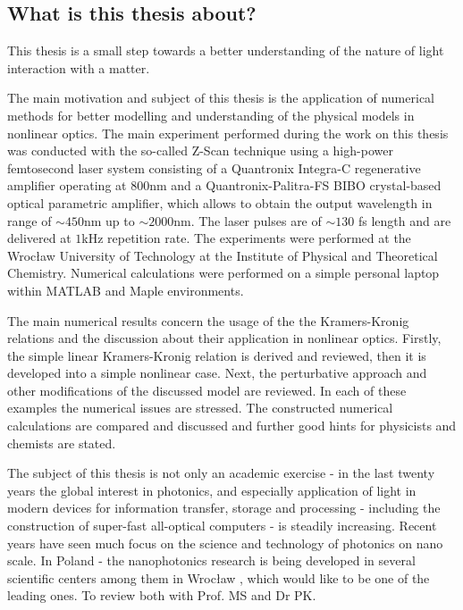 \documentclass[12pt,twoside,a4paper]{article}
\numberwithin{equation}{subsection}
\numberwithin{figure}{subsection}
\begin{document}
\subsection{What is this thesis about?} \label{chap:introducion_what}


This thesis is a small step towards a better understanding of the nature of light interaction with a matter.

The main motivation and subject of this thesis is the application of numerical methods for better modelling and understanding of
the physical models in nonlinear optics. The main experiment performed during the work on this thesis was conducted with the
so-called Z-Scan technique using a high-power femtosecond laser system consisting of a Quantronix Integra-C regenerative amplifier operating at
$800$nm and a Quantronix-Palitra-FS BIBO crystal-based optical parametric amplifier, which allows to obtain the output
wavelength in range of $\sim 450$nm up to $\sim 2000$nm. The laser pulses are of $\sim 130$ fs length and are delivered at $1$kHz repetition
rate. The experiments were performed at the Wrocław University of Technology at the Institute of Physical and Theoretical
Chemistry. Numerical calculations were performed on a simple personal laptop within MATLAB and Maple environments.

The main numerical results concern the usage of the the Kramers-Kronig relations and the discussion about their application in
nonlinear optics. Firstly, the simple linear Kramers-Kronig relation is derived and reviewed, then it is developed into a simple
nonlinear case. Next, the perturbative approach and other modifications of the discussed model are reviewed. In each of these
examples the numerical issues are stressed. The constructed numerical calculations are compared and discussed and further good
hints for physicists and chemists are stated.

The subject of this thesis is not only an academic exercise - in the last twenty years the global interest in photonics, and
especially application of light in modern devices for information transfer, storage and processing - including the construction of super-fast
all-optical computers - is steadily increasing. Recent years have seen much focus on the science and technology of photonics on
nano scale. In Poland - the nanophotonics research is being developed in several scientific centers among them in Wrocław , which
would like to be one of the leading ones. To review both with Prof. MS and Dr PK.
\end{document}
